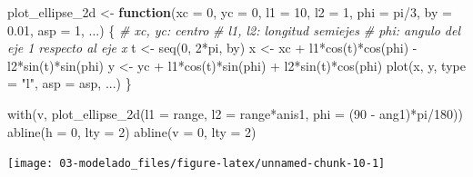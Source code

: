 \documentclass[
  spanish,
]{book}
\newenvironment{Shaded}{\begin{snugshade}}{\end{snugshade}}
\newcommand{\AttributeTok}[1]{\textcolor[rgb]{0.77,0.63,0.00}{#1}}
\newcommand{\CommentTok}[1]{\textcolor[rgb]{0.56,0.35,0.01}{\textit{#1}}}
\newcommand{\ControlFlowTok}[1]{\textcolor[rgb]{0.13,0.29,0.53}{\textbf{#1}}}
\newcommand{\DecValTok}[1]{\textcolor[rgb]{0.00,0.00,0.81}{#1}}
\newcommand{\FloatTok}[1]{\textcolor[rgb]{0.00,0.00,0.81}{#1}}
\newcommand{\FunctionTok}[1]{\textcolor[rgb]{0.00,0.00,0.00}{#1}}
\newcommand{\NormalTok}[1]{#1}
\newcommand{\OtherTok}[1]{\textcolor[rgb]{0.56,0.35,0.01}{#1}}
\newcommand{\SpecialCharTok}[1]{\textcolor[rgb]{0.00,0.00,0.00}{#1}}
\newcommand{\StringTok}[1]{\textcolor[rgb]{0.31,0.60,0.02}{#1}}
\theoremstyle{break}
\theoremstyle{definition}
\theoremstyle{definition}
\theoremstyle{definition}
\theoremstyle{definition}
\theoremstyle{remark}
\begin{document}
\begin{Shaded}
\begin{Highlighting}[]
\NormalTok{plot\_ellipse\_2d }\OtherTok{\textless{}{-}} \ControlFlowTok{function}\NormalTok{(}\AttributeTok{xc =} \DecValTok{0}\NormalTok{, }\AttributeTok{yc =} \DecValTok{0}\NormalTok{, }\AttributeTok{l1 =} \DecValTok{10}\NormalTok{, }\AttributeTok{l2 =} \DecValTok{1}\NormalTok{, }\AttributeTok{phi =}\NormalTok{ pi}\SpecialCharTok{/}\DecValTok{3}\NormalTok{, }
                            \AttributeTok{by =} \FloatTok{0.01}\NormalTok{, }\AttributeTok{asp =} \DecValTok{1}\NormalTok{, ...) \{}
    \CommentTok{\# xc, yc: centro}
    \CommentTok{\# l1, l2: longitud semiejes}
    \CommentTok{\# phi: angulo del eje 1 respecto al eje x}
\NormalTok{    t }\OtherTok{\textless{}{-}} \FunctionTok{seq}\NormalTok{(}\DecValTok{0}\NormalTok{, }\DecValTok{2}\SpecialCharTok{*}\NormalTok{pi, by)}
\NormalTok{    x }\OtherTok{\textless{}{-}}\NormalTok{ xc }\SpecialCharTok{+}\NormalTok{ l1}\SpecialCharTok{*}\FunctionTok{cos}\NormalTok{(t)}\SpecialCharTok{*}\FunctionTok{cos}\NormalTok{(phi) }\SpecialCharTok{{-}}\NormalTok{ l2}\SpecialCharTok{*}\FunctionTok{sin}\NormalTok{(t)}\SpecialCharTok{*}\FunctionTok{sin}\NormalTok{(phi)}
\NormalTok{    y }\OtherTok{\textless{}{-}}\NormalTok{ yc }\SpecialCharTok{+}\NormalTok{ l1}\SpecialCharTok{*}\FunctionTok{cos}\NormalTok{(t)}\SpecialCharTok{*}\FunctionTok{sin}\NormalTok{(phi) }\SpecialCharTok{+}\NormalTok{ l2}\SpecialCharTok{*}\FunctionTok{sin}\NormalTok{(t)}\SpecialCharTok{*}\FunctionTok{cos}\NormalTok{(phi)}
    \FunctionTok{plot}\NormalTok{(x, y, }\AttributeTok{type =} \StringTok{"l"}\NormalTok{, }\AttributeTok{asp =}\NormalTok{ asp, ...)}
\NormalTok{\}}

\FunctionTok{with}\NormalTok{(v, }\FunctionTok{plot\_ellipse\_2d}\NormalTok{(}\AttributeTok{l1 =}\NormalTok{ range, }\AttributeTok{l2 =}\NormalTok{ range}\SpecialCharTok{*}\NormalTok{anis1, }
                        \AttributeTok{phi =}\NormalTok{ (}\DecValTok{90} \SpecialCharTok{{-}}\NormalTok{ ang1)}\SpecialCharTok{*}\NormalTok{pi}\SpecialCharTok{/}\DecValTok{180}\NormalTok{))}
\FunctionTok{abline}\NormalTok{(}\AttributeTok{h =} \DecValTok{0}\NormalTok{, }\AttributeTok{lty =} \DecValTok{2}\NormalTok{)}
\FunctionTok{abline}\NormalTok{(}\AttributeTok{v =} \DecValTok{0}\NormalTok{, }\AttributeTok{lty =} \DecValTok{2}\NormalTok{)}
\end{Highlighting}
\end{Shaded}

\begin{center}\texttt{[image: 03-modelado\_files/figure-latex/unnamed-chunk-10-1]} \end{center}
\end{document}
